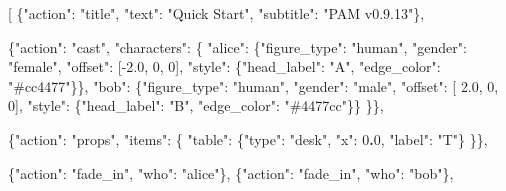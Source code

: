 \documentclass[
  11pt,
]{book}
\newenvironment{Shaded}{}{}
\newcommand{\DataTypeTok}[1]{\textcolor[rgb]{0.56,0.13,0.00}{#1}}
\newcommand{\DecValTok}[1]{\textcolor[rgb]{0.25,0.63,0.44}{#1}}
\newcommand{\ErrorTok}[1]{\textcolor[rgb]{1.00,0.00,0.00}{\textbf{#1}}}
\newcommand{\FloatTok}[1]{\textcolor[rgb]{0.25,0.63,0.44}{#1}}
\newcommand{\FunctionTok}[1]{\textcolor[rgb]{0.02,0.16,0.49}{#1}}
\newcommand{\OtherTok}[1]{\textcolor[rgb]{0.00,0.44,0.13}{#1}}
\newcommand{\StringTok}[1]{\textcolor[rgb]{0.25,0.44,0.63}{#1}}
\begin{document}
\begin{Shaded}
\begin{Highlighting}[]
\OtherTok{[}
  \FunctionTok{\{}\DataTypeTok{"action"}\FunctionTok{:} \StringTok{"title"}\FunctionTok{,} \DataTypeTok{"text"}\FunctionTok{:} \StringTok{"Quick Start"}\FunctionTok{,} \DataTypeTok{"subtitle"}\FunctionTok{:} \StringTok{"PAM v0.9.13"}\FunctionTok{\}}\OtherTok{,}

  \FunctionTok{\{}\DataTypeTok{"action"}\FunctionTok{:} \StringTok{"cast"}\FunctionTok{,} \DataTypeTok{"characters"}\FunctionTok{:} \FunctionTok{\{}
    \DataTypeTok{"alice"}\FunctionTok{:} \FunctionTok{\{}\DataTypeTok{"figure\_type"}\FunctionTok{:} \StringTok{"human"}\FunctionTok{,} \DataTypeTok{"gender"}\FunctionTok{:} \StringTok{"female"}\FunctionTok{,}
              \DataTypeTok{"offset"}\FunctionTok{:} \OtherTok{[}\FloatTok{{-}2.0}\OtherTok{,} \DecValTok{0}\OtherTok{,} \DecValTok{0}\OtherTok{]}\FunctionTok{,}
              \DataTypeTok{"style"}\FunctionTok{:} \FunctionTok{\{}\DataTypeTok{"head\_label"}\FunctionTok{:} \StringTok{"A"}\FunctionTok{,} \DataTypeTok{"edge\_color"}\FunctionTok{:} \StringTok{"\#cc4477"}\FunctionTok{\}\},}
    \DataTypeTok{"bob"}\FunctionTok{:}   \FunctionTok{\{}\DataTypeTok{"figure\_type"}\FunctionTok{:} \StringTok{"human"}\FunctionTok{,} \DataTypeTok{"gender"}\FunctionTok{:} \StringTok{"male"}\FunctionTok{,}
              \DataTypeTok{"offset"}\FunctionTok{:} \OtherTok{[} \FloatTok{2.0}\OtherTok{,} \DecValTok{0}\OtherTok{,} \DecValTok{0}\OtherTok{]}\FunctionTok{,}
              \DataTypeTok{"style"}\FunctionTok{:} \FunctionTok{\{}\DataTypeTok{"head\_label"}\FunctionTok{:} \StringTok{"B"}\FunctionTok{,} \DataTypeTok{"edge\_color"}\FunctionTok{:} \StringTok{"\#4477cc"}\FunctionTok{\}\}}
  \FunctionTok{\}\}}\OtherTok{,}

  \FunctionTok{\{}\DataTypeTok{"action"}\FunctionTok{:} \StringTok{"props"}\FunctionTok{,} \DataTypeTok{"items"}\FunctionTok{:} \FunctionTok{\{}
    \DataTypeTok{"table"}\FunctionTok{:} \FunctionTok{\{}\DataTypeTok{"type"}\FunctionTok{:} \StringTok{"desk"}\FunctionTok{,} \DataTypeTok{"x"}\FunctionTok{:} \DecValTok{0}\ErrorTok{.}\DecValTok{0}\FunctionTok{,} \DataTypeTok{"label"}\FunctionTok{:} \StringTok{"T"}\FunctionTok{\}}
  \FunctionTok{\}\}}\OtherTok{,}

  \FunctionTok{\{}\DataTypeTok{"action"}\FunctionTok{:} \StringTok{"fade\_in"}\FunctionTok{,} \DataTypeTok{"who"}\FunctionTok{:} \StringTok{"alice"}\FunctionTok{\}}\OtherTok{,}
  \FunctionTok{\{}\DataTypeTok{"action"}\FunctionTok{:} \StringTok{"fade\_in"}\FunctionTok{,} \DataTypeTok{"who"}\FunctionTok{:} \StringTok{"bob"}\FunctionTok{\}}\OtherTok{,}


\end{Highlighting}
\end{Shaded}
\end{document}
